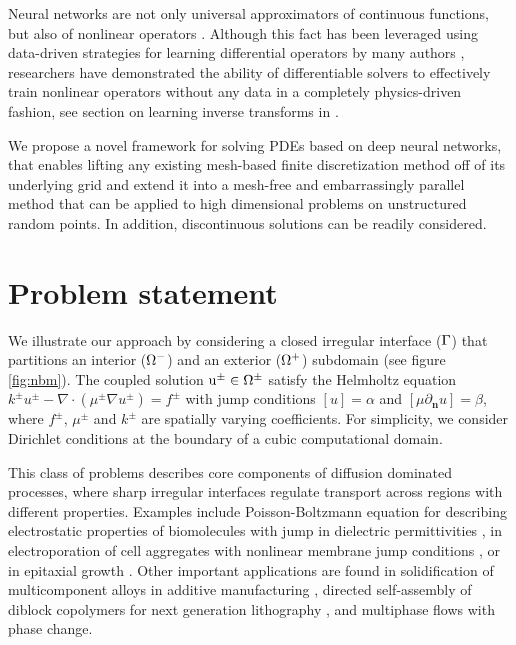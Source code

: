\documentclass{article}
\begin{document}
Neural networks are not only universal approximators of continuous functions, but also of nonlinear operators \cite{chen1995universal}. Although this fact has been leveraged using data-driven strategies for learning differential operators by many authors \cite{lu2019deeponet,bhattacharya2020model,li2020neural,li2020fourier}, researchers have demonstrated the ability of differentiable solvers to effectively train nonlinear operators without any data in a completely physics-driven fashion, see section on learning inverse transforms in \cite{pakravan2021solving}.

We propose a novel framework for solving PDEs based on deep neural networks, that enables lifting any existing mesh-based finite discretization method off of its underlying grid and extend it into a mesh-free and embarrassingly parallel method that can be applied to high dimensional problems on unstructured random points. In addition, discontinuous solutions can be readily considered.

\section{Problem statement}
We illustrate our approach by considering a closed irregular interface ($\rm \Gamma$) that partitions an interior ($\rm \Omega^-$) and an exterior ($\rm \Omega^+$) subdomain (see figure \ref{fig:nbm}). The coupled solution $\rm u^\pm\in \Omega^\pm$ satisfy the Helmholtz equation $k^{\pm}u^{\pm} - \nabla \cdot (\mu^{\pm}\nabla u^\pm)=f^{\pm}$ with jump conditions $[u]=\alpha$ and $[\mu \partial_{\mathbf{n}}u]=\beta$,
where $f^\pm$, $\mu^\pm$ and $k^\pm$ are spatially varying coefficients. For simplicity, we consider Dirichlet conditions at the boundary of a cubic computational domain.%


This class of problems describes core components of diffusion dominated processes, where sharp irregular interfaces regulate transport across regions with different properties. Examples include Poisson-Boltzmann equation for describing electrostatic properties of biomolecules with jump in dielectric permittivities \cite{sharp1990calculating,MirzadehPB}, in electroporation of cell aggregates with nonlinear membrane jump conditions \cite{mistani2019parallel}, or in epitaxial growth \cite{MISTANI2018150}. Other important applications are found in solidification of multicomponent alloys in additive manufacturing \citep{theillard2015sharp,bochkov2021sharp}, directed self-assembly of diblock copolymers for next generation lithography \cite{galatsis2010patterning,ouaknin2018level,bochkov2021non}, and multiphase flows with phase change. 
\end{document}
